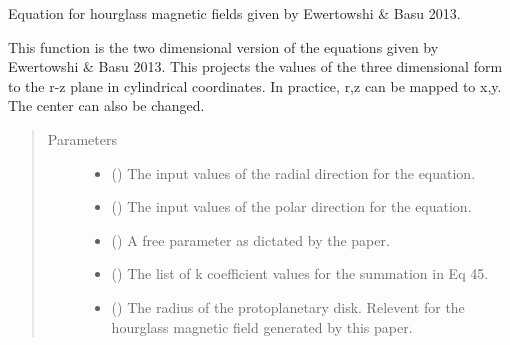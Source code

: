 \documentclass[letterpaper,10pt,english]{sphinxmanual}
\begin{document}

\begin{fulllineitems}
\label{\detokenize{magnetic_field_functions_2d:magnetic_field_functions_2d.hourglass_magnetic_field_cart_2d}}
Equation for hourglass magnetic fields given by Ewertowshi \& Basu 2013.

This function is the two dimensional version of the equations given by
Ewertowshi \& Basu 2013. This projects the values of the three dimensional
form to the r-z plane in cylindrical coordinates. In practice, r,z can be
mapped to x,y. The center can also be changed.
\begin{quote}\begin{description}
\item[{Parameters}] \leavevmode\begin{itemize}
\item {} 
 () \textendash{} The input values of the radial direction for the equation.

\item {} 
 () \textendash{} The input values of the polar direction for the equation.

\item {} 
 () \textendash{} A free parameter as dictated by the paper.

\item {} 
 () \textendash{} The list of k coefficient values for the summation in Eq 45.

\item {} 
 () \textendash{} The radius of the protoplanetary disk. Relevent for the hourglass
magnetic field generated by this paper.


\end{itemize}
\end{description}
\end{quote}
\end{fulllineitems}
\end{document}

